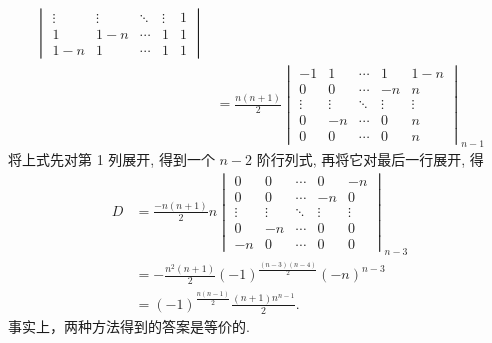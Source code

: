 \documentclass[12pt,fontset=fandol]{ctexart}
\begin{document}
\begin{solve}
\begin{enumerate}
\begin{enumerate}
\begin{align*}
\begin{vmatrix}
                                        \vdots & \vdots & \ddots & \vdots & 1   \\
                                        1      & 1-n    & \cdots & 1      & 1   \\
                                        1-n    & 1      & \cdots & 1      & 1
                                    \end{vmatrix}                         \\
                                      & =\frac{n(n+1)}{2}\begin{vmatrix}
                                                             -1     & 1      & \cdots & 1      & 1-n    \\
                                                             0      & 0      & \cdots & -n     & n      \\
                                                             \vdots & \vdots & \ddots & \vdots & \vdots \\
                                                             0      & -n     & \cdots & 0      & n      \\
                                                             0      & 0      & \cdots & 0      & n
                                                         \end{vmatrix}_{n-1}
                                \end{align*}
                                将上式先对第 1 列展开, 得到一个 $n-2$ 阶行列式, 再将它对最后一行展开, 得
                                \begin{align*}
                                    D & =\frac{-n(n+1)}{2} n
                                    \begin{vmatrix}
                                        0      & 0      & \cdots & 0      & -n     \\
                                        0      & 0      & \cdots & -n     & 0      \\
                                        \vdots & \vdots & \ddots & \vdots & \vdots \\
                                        0      & -n     & \cdots & 0      & 0      \\
                                        -n     & 0      & \cdots & 0      & 0
                                    \end{vmatrix}_{n-3}                      \\
                                      & =-\frac{n^{2}(n+1)}{2}(-1)^{\frac{(n-3)(n-4)}{2}}(-n)^{n-3} \\
                                      & =(-1)^{\frac{n(n-1)}{2} }\frac{(n+1) n^{n-1}}{2}.
                                \end{align*}
                                事实上，两种方法得到的答案是等价的.
                      \end{enumerate}
            \end{enumerate}
\end{solve}
\end{document}
